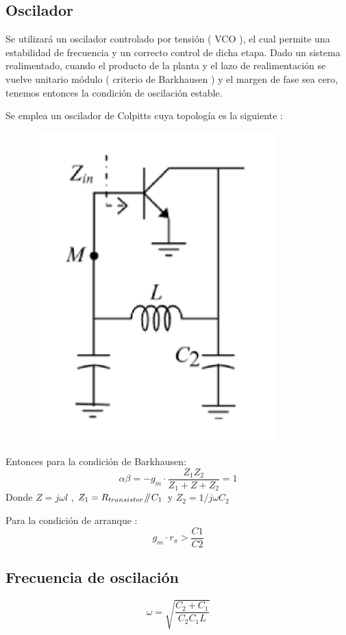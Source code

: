 \documentclass{article}
\newcommand{\parallelsum}{\mathbin{\!/\mkern-5mu/\!}}
\begin{document}
{\subsection{Oscilador}
Se utilizará un oscilador controlado por tensión ( VCO ), el cual permite una estabilidad de frecuencia y un correcto control de dicha etapa.
Dado un sistema realimentado, cuando el producto de la planta y el lazo de realimentación se vuelve unitario módulo ( criterio de Barkhausen ) y el margen de fase sea cero, tenemos entonces la condición de oscilación estable.\par
Se emplea un oscilador de Colpitts cuya topología es la siguiente :
\begin{figure}[H]
  \centering
    \includegraphics[scale=0.55]{COLPITTS}
  \caption{  }
\end{figure}
Entonces para la condición de Barkhausen:
$$
\alpha\beta = - g_{m} \cdot \frac{Z_{1} Z_{2}}{Z_{1} + Z + Z_{2}} = 1
$$
Donde $Z = j\omega l$ , $Z_1 = R_{transistor} \parallelsum C_1 $ y $Z_2 = 1/j\omega C_2$
\par
Para la condición de arranque :
$$
g_m \cdot r_{\pi} > \frac{C1}{C2}
$$
\subsection{Frecuencia de oscilación}
$$
\omega = \sqrt{\frac{C_2 + C_1}{C_2 C_1 L}}
$$
}
\end{document}
